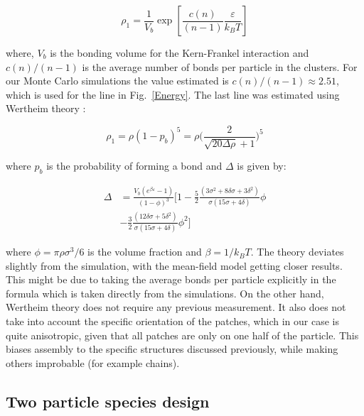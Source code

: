 \documentclass[a4paper, amsfonts, amssymb, amsmath, reprint, showkeys, nofootinbib, twoside]{revtex4-1}
\begin{document}
\begin{equation}\label{meanfield}
\rho_1=\frac{1}{V_b}\exp[\frac{c(n)}{(n-1)} \frac{\varepsilon}{k_B T}]
\end{equation}

\noindent where, $V_b$ is the bonding volume for the Kern-Frankel interaction and $c(n)/(n-1)$ is the average number of bonds per particle in the clusters. For our Monte Carlo simulations the value estimated is $c(n)/(n-1)\approx 2.51$, which is used for the line in Fig.~\ref{Energy}. The last line was estimated using Wertheim theory \cite{Sciortino2007, Russo2021}:

\begin{equation}\label{wertheim}
\rho_1 = \rho (1-p_b)^5 = \rho \bigg(\frac{2}{\sqrt{20 \Delta \rho}+1}\bigg)^5
\end{equation}

\noindent where $p_b$ is the probability of forming a bond and $\Delta$ is given by:

\begin{equation}\label{delta}
\begin{split}
\Delta & = \frac{V_b (e^{\beta\varepsilon}-1)}{(1-\phi)^3} \bigg[ 1 - \frac{5}{2} \frac{(3\sigma^2+8\delta\sigma+3\delta^2)}{\sigma(15\sigma+4\delta)}\phi \\
& - \frac{3}{2}\frac{(12\delta\sigma+5\delta^2)}{\sigma(15\sigma+4\delta)}\phi^2 \bigg]
\end{split}
\end{equation}

\noindent where $\phi=\pi\rho\sigma^3/6$ is the volume fraction and $\beta=1/k_B T$. The theory deviates slightly from the simulation, with the mean-field model getting closer results. This might be due to taking the average bonds per particle explicitly in the formula which is taken directly from the simulations. On the other hand, Wertheim theory does not require any previous measurement. It also does not take into account the specific orientation of the patches, which in our case is quite anisotropic, given that all patches are only on one half of the particle. This biases assembly to the specific structures discussed previously, while making others improbable (for example chains).

\subsection{Two particle species design}
\end{document}
